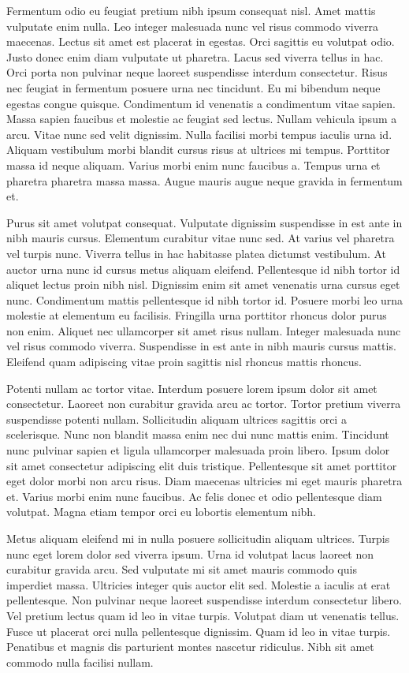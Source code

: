 \documentclass[11pt,a4paper]{article}
\begin{document}
Fermentum odio eu feugiat pretium nibh ipsum consequat nisl. Amet mattis vulputate enim nulla. Leo integer malesuada nunc vel risus commodo viverra maecenas. Lectus sit amet est placerat in egestas. Orci sagittis eu volutpat odio. Justo donec enim diam vulputate ut pharetra. Lacus sed viverra tellus in hac. Orci porta non pulvinar neque laoreet suspendisse interdum consectetur. Risus nec feugiat in fermentum posuere urna nec tincidunt. Eu mi bibendum neque egestas congue quisque. Condimentum id venenatis a condimentum vitae sapien. Massa sapien faucibus et molestie ac feugiat sed lectus. Nullam vehicula ipsum a arcu. Vitae nunc sed velit dignissim. Nulla facilisi morbi tempus iaculis urna id. Aliquam vestibulum morbi blandit cursus risus at ultrices mi tempus. Porttitor massa id neque aliquam. Varius morbi enim nunc faucibus a. Tempus urna et pharetra pharetra massa massa. Augue mauris augue neque gravida in fermentum et.

Purus sit amet volutpat consequat. Vulputate dignissim suspendisse in est ante in nibh mauris cursus. Elementum curabitur vitae nunc sed. At varius vel pharetra vel turpis nunc. Viverra tellus in hac habitasse platea dictumst vestibulum. At auctor urna nunc id cursus metus aliquam eleifend. Pellentesque id nibh tortor id aliquet lectus proin nibh nisl. Dignissim enim sit amet venenatis urna cursus eget nunc. Condimentum mattis pellentesque id nibh tortor id. Posuere morbi leo urna molestie at elementum eu facilisis. Fringilla urna porttitor rhoncus dolor purus non enim. Aliquet nec ullamcorper sit amet risus nullam. Integer malesuada nunc vel risus commodo viverra. Suspendisse in est ante in nibh mauris cursus mattis. Eleifend quam adipiscing vitae proin sagittis nisl rhoncus mattis rhoncus.

Potenti nullam ac tortor vitae. Interdum posuere lorem ipsum dolor sit amet consectetur. Laoreet non curabitur gravida arcu ac tortor. Tortor pretium viverra suspendisse potenti nullam. Sollicitudin aliquam ultrices sagittis orci a scelerisque. Nunc non blandit massa enim nec dui nunc mattis enim. Tincidunt nunc pulvinar sapien et ligula ullamcorper malesuada proin libero. Ipsum dolor sit amet consectetur adipiscing elit duis tristique. Pellentesque sit amet porttitor eget dolor morbi non arcu risus. Diam maecenas ultricies mi eget mauris pharetra et. Varius morbi enim nunc faucibus. Ac felis donec et odio pellentesque diam volutpat. Magna etiam tempor orci eu lobortis elementum nibh.

Metus aliquam eleifend mi in nulla posuere sollicitudin aliquam ultrices. Turpis nunc eget lorem dolor sed viverra ipsum. Urna id volutpat lacus laoreet non curabitur gravida arcu. Sed vulputate mi sit amet mauris commodo quis imperdiet massa. Ultricies integer quis auctor elit sed. Molestie a iaculis at erat pellentesque. Non pulvinar neque laoreet suspendisse interdum consectetur libero. Vel pretium lectus quam id leo in vitae turpis. Volutpat diam ut venenatis tellus. Fusce ut placerat orci nulla pellentesque dignissim. Quam id leo in vitae turpis. Penatibus et magnis dis parturient montes nascetur ridiculus. Nibh sit amet commodo nulla facilisi nullam.
\end{document}
